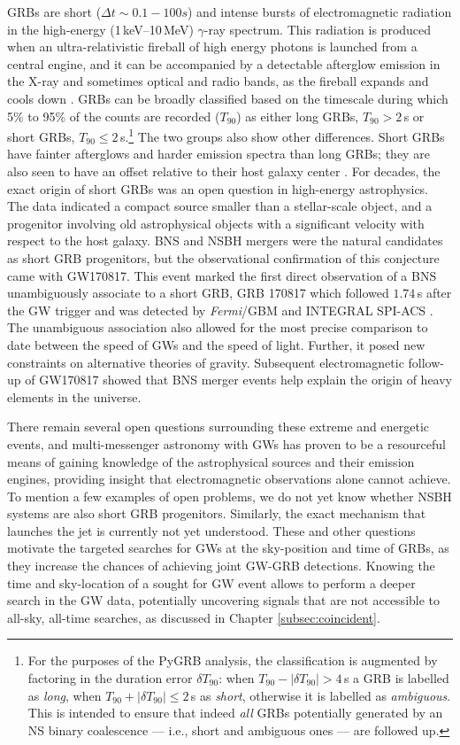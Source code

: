 \documentclass[binding=0.6cm, LaM]{sapthesis}
\begin{document}
	GRBs are short ($\Delta t \sim 0.1-100s$) and intense bursts of 
	electromagnetic radiation in the high-energy (1\,keV--10\,MeV) $\gamma$-ray spectrum.
	This radiation is produced when an ultra-relativistic fireball of high energy photons 
	is launched from a central engine, and it can be accompanied by a detectable afterglow emission 
	in the X-ray and sometimes optical and radio bands, as the fireball expands and cools down \cite{139}.
	GRBs can be broadly classified based on the timescale during which 5\% to 95\% of the counts are recorded ($T_{90}$)
	as either long GRBs, $T_{90} > 2\,$s or short GRBs, $T_{90} \leq 2\,$s.\footnote{For the purposes of the {\ttfamily PyGRB} analysis, the classification is augmented by factoring in the duration error $\delta T_{90}$: 
        when $T_{90}-|\delta T_{90}| > 4\,$s a GRB is labelled as {\it long},
	when $T_{90}+|\delta T_{90}| \leq 2\,$s as {\it short},
        otherwise it is labelled as {\it ambiguous}.  This is intended to ensure that indeed {\it all} GRBs potentially generated by an NS binary coalescence --- i.e., short and ambiguous ones --- are followed up.}
	The two groups also show other differences.  
	Short GRBs have fainter afterglows and harder emission spectra than long GRBs; 
	they are also seen to have an offset relative to their host galaxy center \cite{154}.
	For decades, the exact origin of short GRBs was an open question in high-energy astrophysics.  
	The data indicated a compact source smaller than a stellar-scale object, 
	and a progenitor involving old astrophysical objects with a significant velocity with respect to the host galaxy.  
	BNS and NSBH mergers were the natural candidates as short GRB progenitors, 
	but the observational confirmation of this conjecture came with GW170817.
	This event marked the first direct observation of a BNS unambiguously associate to a short GRB, 
	GRB 170817 which followed $1.74\,$s after the GW trigger and was detected by {\it Fermi}/GBM and INTEGRAL SPI-ACS \cite{15}.
	The unambiguous association also allowed for the most precise comparison to date
	between the speed of GWs and the speed of light.  
	Further, it posed new constraints on alternative theories of gravity. 
	Subsequent electromagnetic follow-up of GW170817 showed that BNS merger events 
	help explain the origin of heavy elements in the universe.

	There remain several open questions surrounding these extreme and energetic events, 
	and multi-messenger astronomy with GWs has proven to be a resourceful means of gaining 
	knowledge of the astrophysical sources and their emission engines, 
	providing insight that electromagnetic observations alone cannot achieve.
	To mention a few examples of open problems, we do not yet know whether NSBH systems are also short GRB progenitors.  
	Similarly, the exact mechanism that launches the jet is currently not yet understood.
        These and other questions motivate the targeted searches for GWs at the sky-position and time of GRBs, 
	as they increase the chances of achieving joint GW-GRB detections.
	Knowing the time and sky-location of a sought for GW event
	allows to perform a deeper search in the GW data, potentially uncovering signals 
	that are not accessible to all-sky, all-time searches, as discussed in Chapter \ref{subsec:coincident}.
\end{document}
